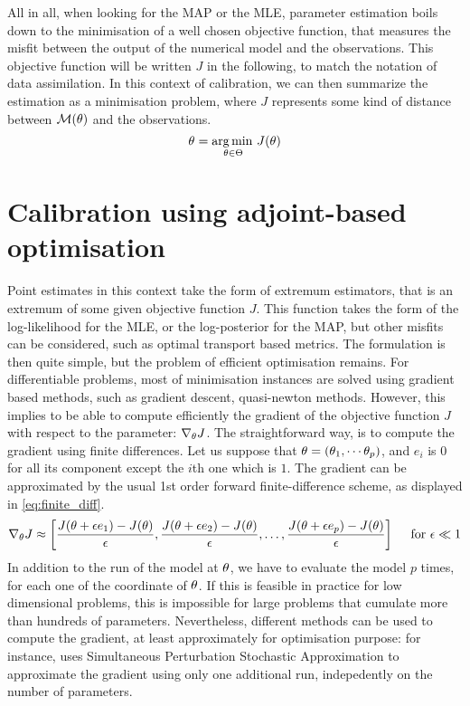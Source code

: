 \documentclass[../../Main_ManuscritThese.tex]{subfiles}
\begin{document}
All in all, when looking for the MAP or the MLE, parameter estimation
boils down to the minimisation of a well chosen objective function,
that measures the misfit between the output of the numerical model and
the observations. This objective function will be written $J$ in the
following, to match the notation of data assimilation.  In this
context of calibration, we can then summarize the estimation as a
minimisation problem, where $J$ represents some kind of distance
between $\mathcal{M}(\theta)$ and the observations.
\begin{equation}
  {\theta}_{\mathrm{}} = \operatorname*{arg\,min \,}_{\theta\in \Theta} J(\theta)
\end{equation}

\section{Calibration using adjoint-based optimisation}
\label{sec:calibration_adjoint_optimization}
Point estimates in this context take the form of extremum estimators,
that is an extremum of some given objective function $J$. This
function takes the form of the log-likelihood for the MLE, or the
log-posterior for the MAP, but other misfits can be considered, such
as optimal transport based metrics. The formulation is then quite
simple, but the problem of efficient optimisation remains. For
differentiable problems, most of minimisation instances are solved
using gradient based methods, such as gradient descent, quasi-newton
methods.  However, this implies to be able to compute efficiently the
gradient of the objective function $J$ with respect to the parameter:
$\nabla_{\theta} J$. The straightforward way, is to compute the
gradient using finite differences. Let us suppose that
$\theta = (\theta_1,\cdots \theta_p)$, and $e_i$ is 0 for all its
component except the $i$th one which is $1$. The gradient can be
approximated by the usual 1st order forward finite-difference scheme,
as displayed in \cref{eq:finite_diff}.
\begin{equation}
  \label{eq:finite_diff}
  \nabla_{\theta} J  \approx \left[\frac{J(\theta + \epsilon e_1) - J(\theta)}{\epsilon}, \frac{J(\theta + \epsilon e_2) - J(\theta)}{ \epsilon},\dots, \frac{J(\theta + \epsilon e_p)- J(\theta)}{\epsilon} \right] \quad \text{ for } \epsilon \ll 1
\end{equation}
In addition to the run of the model at $\theta$, we have to evaluate
the model $p$ times, for each one of the coordinate of $\theta$. If
this is feasible in practice for low dimensional problems, this is
impossible for large problems that cumulate more than hundreds of
parameters. Nevertheless, different methods can be used to compute the
gradient, at least approximately for optimisation purpose: for
instance, \cite{boutet_estimation_2015} uses Simultaneous Perturbation
Stochastic Approximation to approximate the gradient using only one
additional run, indepedently on the number of parameters.
\end{document}
